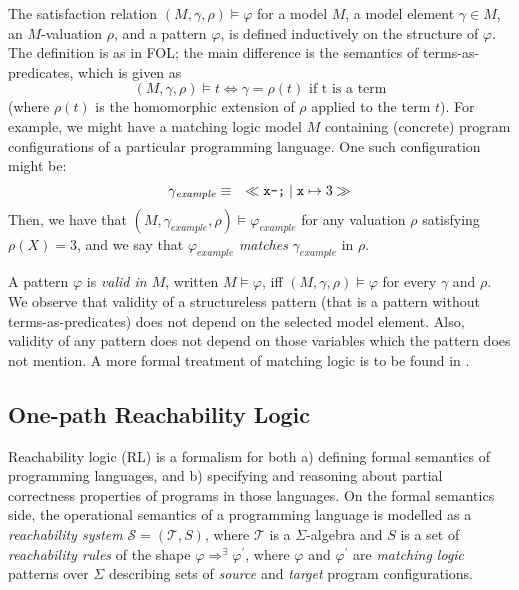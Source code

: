 The satisfaction relation $(M, \gamma, \rho) \vDash \varphi$ for a model $M$, a model element $\gamma \in M$,
an $M$-valuation $\rho$, and a pattern $\varphi$, is defined inductively on the structure of $\varphi$.
The definition is as in FOL; the main difference is the semantics of
terms-as-predicates, which is given as
\begin{equation*}
    (M, \gamma, \rho) \vDash t \iff \gamma = \rho(t) \text{ if t is a term}
\end{equation*}
(where $\rho(t)$ is the homomorphic extension of $\rho$ applied to the term $t$).
For example, we might have a matching logic model $M$ containing (concrete) program configurations
of a particular programming language.
One such configuration might be:
\begin{equation*}
  \gamma_{\mathit{example}} \equiv\quad \ll\texttt{x--;}\mid \mathtt{x}\mapsto 3\gg
\end{equation*}
Then, we have that $(M, \gamma_{\mathit{example}}, \rho) \vDash \varphi_{\mathit{example}}$
for any valuation $\rho$ satisfying $\rho(X) = 3$, and we say that
$\varphi_{\mathit{example}}$ \emph{matches} $\gamma_{\mathit{example}}$ in $\rho$.


A pattern $\varphi$ is \emph{valid in $M$}, written $M \vDash \varphi$, iff $(M, \gamma, \rho) \vDash \varphi$
for every $\gamma$ and $\rho$.
We observe that validity of a structureless pattern (that is a pattern without terms-as-predicates) does not depend on the selected model element.
Also, validity of any pattern does not depend on those variables which the pattern does not mention.
A more formal treatment of matching logic is to be found in .


\subsection{One-path Reachability Logic}
Reachability logic \cite{RosuS12oopsla, StefanescuCMMSR19} (RL) is a formalism for
both a) defining formal semantics of programming languages,
and b) specifying and reasoning about partial correctness properties
of programs in those languages.
On the formal semantics side, the operational semantics of a programming language is modelled as a \emph{reachability system}
$\mathcal{S} = (\mathcal{T}, S)$, where $\mathcal{T}$ is a $\Sigma$-algebra
and $S$ is a set of \emph{reachability rules} of the shape $\varphi \Rightarrow^\exists \varphi^\prime$,
where $\varphi$ and $\varphi^\prime$ are \emph{matching logic} patterns over $\Sigma$
describing sets of \emph{source} and \emph{target} program configurations.

